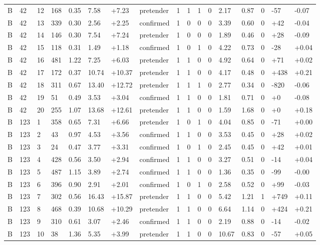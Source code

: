 \documentclass[11pt,a4paper]{article}
\begin{document}
{\begin{longtable}[]{@{}lllllllllllllllll@{}}
B & 42 & 12 & 168 & 0.35 & 7.58 & +7.23 & pretender & 1 & 1 & 1 & 0 & 2.17 & 0.87 & 0 & -57 & -0.07 \\
B & 42 & 13 & 339 & 0.30 & 2.56 & +2.25 & confirmed & 1 & 0 & 0 & 0 & 3.39 & 0.60 & 0 & +42 & -0.04 \\
B & 42 & 14 & 146 & 0.30 & 7.54 & +7.24 & pretender & 1 & 0 & 0 & 0 & 1.89 & 0.46 & 0 & +28 & -0.09 \\
B & 42 & 15 & 118 & 0.31 & 1.49 & +1.18 & confirmed & 1 & 0 & 1 & 0 & 4.22 & 0.73 & 0 & -28 & +0.04 \\
B & 42 & 16 & 481 & 1.22 & 7.25 & +6.03 & pretender & 1 & 1 & 0 & 0 & 4.92 & 0.64 & 0 & +71 & +0.02 \\
B & 42 & 17 & 172 & 0.37 & 10.74 & +10.37 & pretender & 1 & 1 & 0 & 0 & 4.17 & 0.48 & 0 & +438 & +0.21 \\
B & 42 & 18 & 311 & 0.67 & 13.40 & +12.72 & pretender & 1 & 1 & 1 & 0 & 2.77 & 0.34 & 0 & -820 & -0.06 \\
B & 42 & 19 & 51 & 0.49 & 3.53 & +3.04 & confirmed & 1 & 1 & 0 & 0 & 1.81 & 0.71 & 0 & +0 & -0.08 \\
B & 42 & 20 & 255 & 1.07 & 13.68 & +12.61 & pretender & 1 & 1 & 0 & 0 & 1.59 & 1.68 & 0 & +0 & +0.18 \\
B & 123 & 1 & 358 & 0.65 & 7.31 & +6.66 & pretender & 1 & 0 & 1 & 0 & 4.04 & 0.85 & 0 & -71 & +0.00 \\
B & 123 & 2 & 43 & 0.97 & 4.53 & +3.56 & confirmed & 1 & 1 & 0 & 0 & 3.53 & 0.45 & 0 & +28 & +0.02 \\
B & 123 & 3 & 24 & 0.47 & 3.77 & +3.31 & confirmed & 1 & 0 & 1 & 0 & 2.45 & 0.45 & 0 & +42 & +0.01 \\
B & 123 & 4 & 428 & 0.56 & 3.50 & +2.94 & confirmed & 1 & 1 & 0 & 0 & 3.27 & 0.51 & 0 & -14 & +0.04 \\
B & 123 & 5 & 487 & 1.15 & 3.89 & +2.74 & confirmed & 1 & 1 & 0 & 0 & 1.36 & 0.35 & 0 & -99 & -0.00 \\
B & 123 & 6 & 396 & 0.90 & 2.91 & +2.01 & confirmed & 1 & 0 & 1 & 0 & 2.58 & 0.52 & 0 & +99 & -0.03 \\
B & 123 & 7 & 302 & 0.56 & 16.43 & +15.87 & pretender & 1 & 1 & 0 & 0 & 5.42 & 1.21 & 1 & +749 & +0.11 \\
B & 123 & 8 & 468 & 0.39 & 10.68 & +10.29 & pretender & 1 & 1 & 0 & 0 & 6.64 & 1.14 & 0 & +424 & +0.21 \\
B & 123 & 9 & 310 & 0.61 & 3.07 & +2.46 & confirmed & 1 & 1 & 0 & 0 & 2.19 & 0.88 & 0 & -14 & -0.02 \\
B & 123 & 10 & 38 & 1.36 & 5.35 & +3.99 & pretender & 1 & 1 & 0 & 0 & 10.67 & 0.83 & 0 & -57 & +0.05 \\

\end{longtable}}
\end{document}
